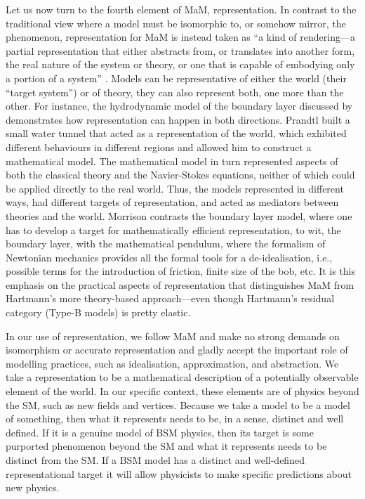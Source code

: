 Let us now turn to the fourth element of MaM, representation.
In contrast to the traditional view where a model must be isomorphic to, or somehow mirror, the phenomenon, representation for MaM is instead taken as ``a kind of rendering---a partial representation that either abstracts from, or translates into another form, the real nature of the system or theory, or one that is capable of embodying only a portion of a system'' \citep[p.~27]{morganmorrison}.
Models can be representative of either the world (their ``target system'') or of theory, they can also represent both, one more than the other. 
For instance, the hydrodynamic model of the boundary layer discussed by \citep{morrison99} demonstrates how representation can happen in both directions.
Prandtl built a small water tunnel that acted as a representation of the world, which exhibited different behaviours in different regions and allowed him to construct a mathematical model.
The mathematical model in turn represented aspects of both the classical theory and the Navier-Stokes equations, neither of which could be applied directly to the real world. 
Thus, the models represented in different ways, had different targets of representation, and acted as mediators between theories and the world. 
Morrison contrasts the boundary layer model, where one has to develop a target for mathematically efficient representation, to wit, the boundary layer, with the mathematical pendulum, where the formalism of Newtonian mechanics provides all the formal tools for a de-idealisation, i.e., possible terms for the introduction of friction, finite size of the bob, etc. 
It is this emphasis on the practical aspects of representation that distinguishes MaM from Hartmann's more theory-based approach---even though Hartmann's residual category (Type-B models) is pretty elastic.

In our use of representation, we follow MaM and make no strong demands on isomorphism or accurate representation and gladly accept the important role of modelling practices, such as idealisation, approximation, and abstraction. 
We take a representation to be a mathematical description of a potentially observable element of the world. 
In our specific context, these elements are of physics beyond the SM, such as new fields and vertices.
Because we take a model to be a model of something, then what it represents needs to be, in a sense, distinct and well defined. 
If it is a genuine model of BSM physics, then its target is some purported phenomenon beyond the SM and what it represents needs to be distinct from the SM. 
If a BSM model has a distinct and well-defined representational target it will allow physicists to make specific predictions about new physics.

